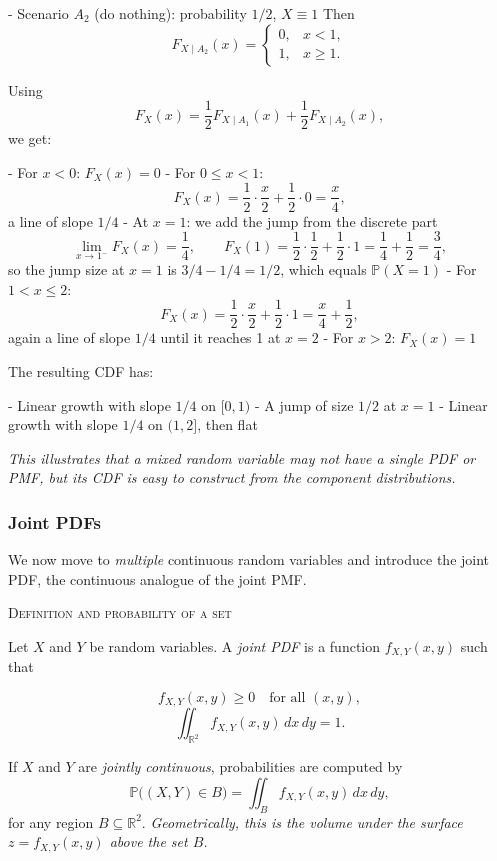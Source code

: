 - Scenario \(A_2\) (do nothing): probability \(1/2\), \(X\equiv 1\)  
  Then
  \[
  F_{X\mid A_2}(x) =
  \begin{cases}
  0, & x < 1,\\
  1, & x \ge 1.
  \end{cases}
  \]

Using
\[
F_X(x)
=
\frac{1}{2}F_{X\mid A_1}(x) + \frac{1}{2}F_{X\mid A_2}(x),
\]
we get:

- For \(x<0\): \(F_X(x)=0\)  
- For \(0 \le x < 1\):
  \[
  F_X(x) = \frac{1}{2}\cdot \frac{x}{2} + \frac{1}{2}\cdot 0 = \frac{x}{4},
  \]
  a line of slope \(1/4\)  
- At \(x=1\): we add the jump from the discrete part
  \[
  \lim_{x\to 1^-}F_X(x) = \frac{1}{4}, \qquad F_X(1) = \frac{1}{2}\cdot\frac{1}{2} + \frac{1}{2}\cdot 1 = \frac{1}{4} + \frac{1}{2} = \frac{3}{4},
  \]
  so the jump size at \(x=1\) is \(3/4 - 1/4 = 1/2\), which equals \(\mathbb{P}(X=1)\)  
- For \(1 < x \le 2\):
  \[
  F_X(x) = \frac{1}{2}\cdot\frac{x}{2} + \frac{1}{2}\cdot 1 = \frac{x}{4} + \frac{1}{2},
  \]
  again a line of slope \(1/4\) until it reaches 1 at \(x=2\)  
- For \(x>2\): \(F_X(x)=1\)

The resulting CDF has:

- Linear growth with slope \(1/4\) on \([0,1)\)  
- A jump of size \(1/2\) at \(x=1\)  
- Linear growth with slope \(1/4\) on \((1,2]\), then flat

\textit{This illustrates that a mixed random variable may not have a single PDF or PMF, but its CDF is easy to construct from the component distributions.}


\subsubsection{Joint PDFs}

We now move to \textit{multiple} continuous random variables and introduce the joint PDF, the continuous analogue of the joint PMF.

\bigskip\textsc{Definition and probability of a set}

Let \(X\) and \(Y\) be random variables.  
A \textit{joint PDF} is a function \(f_{X,Y}(x,y)\) such that

\[
f_{X,Y}(x,y) \ge 0 \quad \text{for all } (x,y),
\]
\[
\iint_{\mathbb{R}^2} f_{X,Y}(x,y)\,dx\,dy = 1.
\]

If \(X\) and \(Y\) are \textit{jointly continuous}, probabilities are computed by
\[
\mathbb{P}\big((X,Y)\in B\big)
=
\iint_B f_{X,Y}(x,y)\,dx\,dy,
\]
for any region \(B\subseteq\mathbb{R}^2\).  
\textit{Geometrically, this is the volume under the surface \(z=f_{X,Y}(x,y)\) above the set \(B\).}

